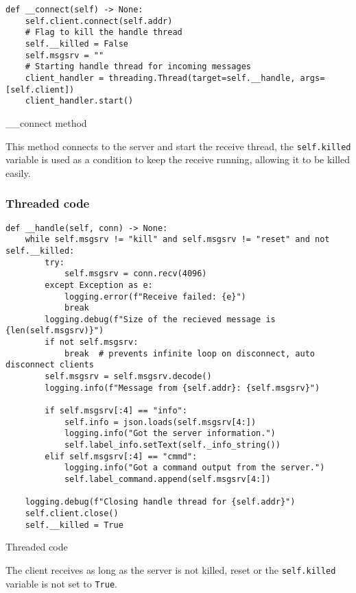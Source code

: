 \documentclass{article}
\begin{document}
\begin{listing}[H]
    \begin{verbatim}
def __connect(self) -> None:
    self.client.connect(self.addr)
    # Flag to kill the handle thread
    self.__killed = False
    self.msgsrv = ""
    # Starting handle thread for incoming messages
    client_handler = threading.Thread(target=self.__handle, args=[self.client])
    client_handler.start()
    \end{verbatim}
    \caption{\_\_connect method}
    \label{client:connect}
\end{listing}

This method connects to the server and start the receive thread, the
\verb|self.killed| variable is used as a condition to keep the receive running,
allowing it to be killed easily.

\subsubsection{Threaded code}
\begin{listing}[H]
    \begin{verbatim}
def __handle(self, conn) -> None:
    while self.msgsrv != "kill" and self.msgsrv != "reset" and not self.__killed:
        try:
            self.msgsrv = conn.recv(4096)
        except Exception as e:
            logging.error(f"Receive failed: {e}")
            break
        logging.debug(f"Size of the recieved message is {len(self.msgsrv)}")
        if not self.msgsrv:
            break  # prevents infinite loop on disconnect, auto disconnect clients
        self.msgsrv = self.msgsrv.decode()
        logging.info(f"Message from {self.addr}: {self.msgsrv}")

        if self.msgsrv[:4] == "info":
            self.info = json.loads(self.msgsrv[4:])
            logging.info("Got the server information.")
            self.label_info.setText(self._info_string())
        elif self.msgsrv[:4] == "cmmd":
            logging.info("Got a command output from the server.")
            self.label_command.append(self.msgsrv[4:])

    logging.debug(f"Closing handle thread for {self.addr}")
    self.client.close()
    self.__killed = True
    \end{verbatim}
    \caption{Threaded code}
    \label{client:thread}
\end{listing}

The client receives as long as the server is not killed, reset or the
\verb|self.killed| variable is not set to \verb|True|. 
\end{document}
